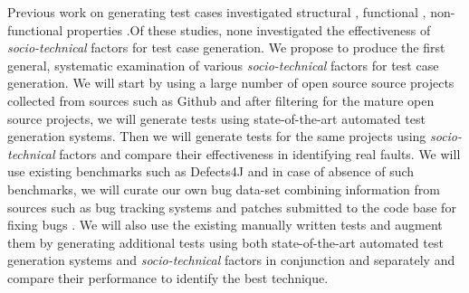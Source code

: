 \documentclass[10pt]{article}
\begin{document}
 Previous work on generating test cases investigated structural \cite{tonella2004evolutionary}, functional \cite{wegener2004evaluation}, non-functional \cite{wegener1998verifying} properties %
.Of these studies, none investigated the effectiveness of \emph{socio-technical} factors for test case generation. We propose to produce the first general, systematic examination of various \emph{socio-technical} factors for test case generation. We will start by using a large number of open source source projects collected from sources such as Github and after filtering for the mature open source projects, we will generate tests using state-of-the-art automated test generation systems. Then we will generate tests for the same projects using \emph{socio-technical} factors and compare their effectiveness in identifying real faults. We will use existing benchmarks such as Defects4J \cite{just2014defects4j} and in case of absence of such benchmarks, we will curate our own bug data-set combining information from  sources such as bug tracking systems and patches submitted to the code base for fixing bugs \cite{ahmed2016can}. 
We will also use the existing manually written tests and augment them by generating additional tests using both state-of-the-art automated test generation systems and \emph{socio-technical} factors in conjunction and separately and compare their performance to identify the best technique.
\end{document}
